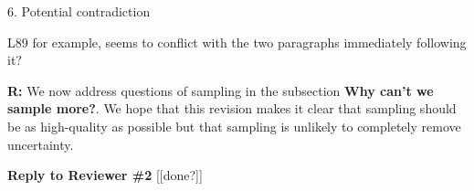 \documentclass[12pt]{letter}
\newenvironment{refquote}{\bigskip \begin{it}}{\end{it}\smallskip}
\begin{document}
	6. Potential contradiction 

		\begin{refquote}
		L89 for example, seems to conflict with the two paragraphs immediately following it?
		\end{refquote}


		\textbf{R:} We now address questions of sampling in the subsection \textbf{Why can't we sample more?}. We hope that this revision makes it clear that sampling should be as high-quality as possible but that sampling is unlikely to completely remove uncertainty.




\clearpage


{\Large \bf Reply to Reviewer \#2} [[done?]]
\end{document}
